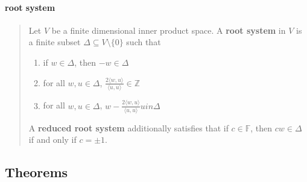 \documentclass[letterpaper, 10pt]{article}
\theoremstyle{theostyle}
\begin{document}
\paragraph{root system}
\begin{quote}
    Let \(V\) be a finite dimensional inner product space.
    A \textbf{root system} in \(V\) is a finite subset \(\Delta \subseteq V \setminus \{0\}\) such that
    \begin{enumerate}
        \item if \(w \in \Delta\), then \(-w \in \Delta\)
        \item for all \(w, u \in \Delta\), \(\frac{2 \langle w, u \rangle}{\langle u, u \rangle} \in \mathbb{Z}\)
        \item for all \(w, u \in \Delta\), \(w - \frac{2 \langle w, u \rangle}{\langle u, u \rangle} u in \Delta\)
    \end{enumerate}

    A \textbf{reduced root system} additionally satisfies that if \(c \in \mathbb{F}\), then \(cw \in \Delta\) if and only if \(c = \pm 1\).
\end{quote}

\subsection{Theorems}
\end{document}
